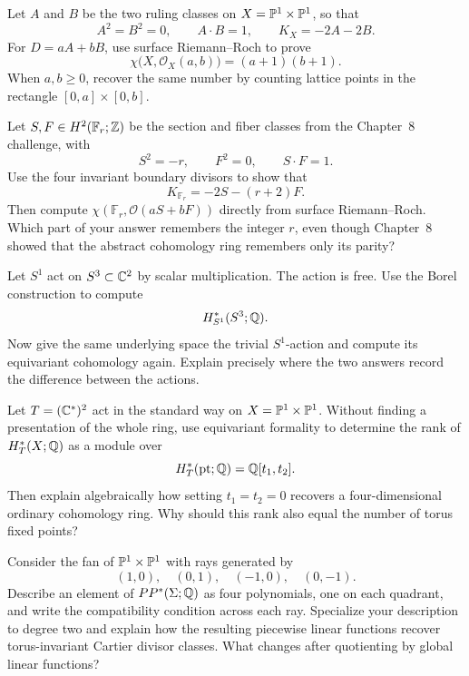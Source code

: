 \begin{exercises}

\item Let \(A\) and \(B\) be the two ruling classes on
\(X=\mathbb{P}^1\times\mathbb{P}^1\), so that
\[
A^2=B^2=0,
\qquad
A\cdot B=1,
\qquad
K_X=-2A-2B.
\]
For \(D=aA+bB\), use surface Riemann--Roch to prove
\[
\chi\bigl(X,\mathcal O_X(a,b)\bigr)=(a+1)(b+1).
\]
When \(a,b\geq0\), recover the same number by counting lattice points
in the rectangle \([0,a]\times[0,b]\).

\item Let \(S,F\in H^2(\mathbb F_r;\mathbb{Z})\) be the section and fiber
classes from the Chapter~8 challenge, with
\[
S^2=-r,
\qquad
F^2=0,
\qquad
S\cdot F=1.
\]
Use the four invariant boundary divisors to show that
\[
K_{\mathbb F_r}=-2S-(r+2)F.
\]
Then compute \(\chi(\mathbb F_r,\mathcal O(aS+bF))\) directly from
surface Riemann--Roch.  Which part of your answer remembers the
integer \(r\), even though Chapter~8 showed that the abstract
cohomology ring remembers only its parity?

\item Let \(S^1\) act on \(S^3\subset\mathbb{C}^2\) by scalar
multiplication.  The action is free.  Use the Borel construction to
compute
\[
H_{S^1}^*(S^3;\mathbb{Q}).
\]
Now give the same underlying space the trivial \(S^1\)-action and
compute its equivariant cohomology again.  Explain precisely where
the two answers record the difference between the actions.

\item Let \(T=(\mathbb{C}^*)^2\) act in the standard way on
\(X=\mathbb{P}^1\times\mathbb{P}^1\).  Without finding a presentation of the whole
ring, use equivariant formality to determine the rank of
\(H_T^*(X;\mathbb{Q})\) as a module over
\[
H_T^*(\mathrm{pt};\mathbb{Q})=\mathbb{Q}[t_1,t_2].
\]
Then explain algebraically how setting \(t_1=t_2=0\) recovers a
four-dimensional ordinary cohomology ring.  Why should this rank also
equal the number of torus fixed points?

\item Consider the fan of \(\mathbb{P}^1\times\mathbb{P}^1\) with rays generated by
\[
(1,0),\quad(0,1),\quad(-1,0),\quad(0,-1).
\]
Describe an element of \(PP^*(\Sigma;\mathbb{Q})\) as four polynomials, one
on each quadrant, and write the compatibility condition across each
ray.  Specialize your description to degree two and explain how the
resulting piecewise linear functions recover torus-invariant Cartier
divisor classes.  What changes after quotienting by global linear
functions?


\end{exercises}
